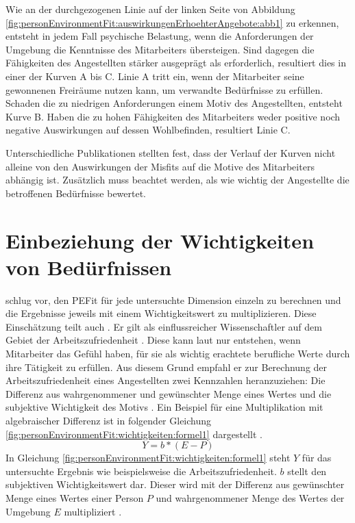 Wie an der durchgezogenen Linie auf der linken Seite von Abbildung \ref{fig:personEnvironmentFit:auswirkungenErhoehterAngebote:abb1} zu erkennen, entsteht in jedem Fall psychische Belastung, wenn die Anforderungen der Umgebung die Kenntnisse des Mitarbeiters übersteigen. Sind dagegen die Fähigkeiten des Angestellten stärker ausgeprägt als erforderlich, resultiert dies in einer der Kurven A bis C. Linie A tritt ein, wenn der Mitarbeiter seine gewonnenen Freiräume nutzen kann, um verwandte Bedürfnisse zu erfüllen. Schaden die zu niedrigen Anforderungen einem Motiv des Angestellten, entsteht Kurve B. Haben die zu hohen Fähigkeiten des Mitarbeiters weder positive noch negative Auswirkungen auf dessen Wohlbefinden, resultiert Linie C. \cite[S. 22f.]{edwards:2008}\cite[S. 12f.]{harrison:1978}

Unterschiedliche Publikationen stellten fest, dass der Verlauf der Kurven nicht alleine von den Auswirkungen der Misfits auf die Motive des Mitarbeiters abhängig ist. Zusätzlich muss beachtet werden, als wie wichtig der Angestellte die betroffenen Bedürfnisse bewertet. \cite[S. 9f.]{edwards:1996}

\section{Einbeziehung der Wichtigkeiten von Bedürfnissen}
\label{ch:personEnvironmentFit:wichtigkeiten}
\textcite[S. 16]{harrison:1985} schlug vor, den \ac{PEFit} für jede untersuchte Dimension einzeln zu berechnen und die Ergebnisse jeweils mit einem Wichtigkeitswert zu multiplizieren. Diese Einschätzung teilt auch \textcite[S. 8ff.]{locke:1976}. Er gilt als einflussreicher Wissenschaftler auf dem Gebiet der Arbeitszufriedenheit \cite[S. 12]{edwards:2008}. Diese kann laut \textcite[S. 8]{locke:1969} nur entstehen, wenn Mitarbeiter das Gefühl haben, für sie als wichtig erachtete berufliche Werte durch ihre Tätigkeit zu erfüllen. Aus diesem Grund empfahl er zur Berechnung der Arbeitszufriedenheit eines Angestellten zwei Kennzahlen heranzuziehen: Die Differenz aus wahrgenommener und gewünschter Menge eines Wertes und die subjektive Wichtigkeit des Motivs \cite[S. 8ff.]{locke:1976}. Ein Beispiel für eine Multiplikation mit algebraischer Differenz ist in folgender Gleichung \ref{fig:personEnvironmentFit:wichtigkeiten:formel1} dargestellt \cite[S. 10]{locke:1976}.
\begin{equation}
	Y = b * (E - P)
	\label{fig:personEnvironmentFit:wichtigkeiten:formel1}
\end{equation}
In Gleichung \ref{fig:personEnvironmentFit:wichtigkeiten:formel1} steht $Y$ für das untersuchte Ergebnis wie beispielsweise die Arbeitszufriedenheit. $b$ stellt den subjektiven Wichtigkeitswert dar. Dieser wird mit der Differenz aus gewünschter Menge eines Wertes einer Person $P$ und wahrgenommener Menge des Wertes der Umgebung $E$ multipliziert \cite[S. 10]{locke:1976}.

